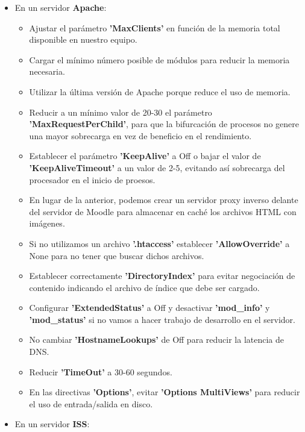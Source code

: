 \documentclass[a4paper, 10pt]{article} %
\begin{document}
\begin{itemize}

    \item En un servidor \textbf{Apache}:
    
    \begin{itemize}
        \item Ajustar el parámetro \textbf{'MaxClients'} en función de la memoria total disponible en nuestro equipo.
        \item Cargar el mínimo número posible de módulos para reducir la memoria necesaria.
        \item Utilizar la última versión de Apache porque reduce el uso de memoria.
        \item Reducir a un mínimo valor de 20-30 el parámetro \textbf{'MaxRequestPerChild'}, para que la bifurcación de procesos no genere una mayor sobrecarga en vez de beneficio en el rendimiento.
        \item Establecer el parámetro \textbf{'KeepAlive'} a Off o bajar el valor de \textbf{'KeepAliveTimeout'} a un valor de 2-5, evitando así sobrecarga del procesador en el inicio de proesos.
        \item En lugar de la anterior, podemos crear un servidor proxy inverso delante del servidor de Moodle para almacenar en caché los archivos HTML con imágenes.
        \item Si no utilizamos un archivo \textbf{'.htaccess'} establecer \textbf{'AllowOverride'} a None para no tener que buscar dichos archivos.
        \item Establecer correctamente \textbf{'DirectoryIndex'} para evitar negociación de contenido indicando el archivo de índice que debe ser cargado.
        \item Configurar \textbf{'ExtendedStatus'} a Off y desactivar \textbf{'mod\_info'} y \textbf{'mod\_status'} si no vamos a hacer trabajo de desarrollo en el servidor.
        \item No cambiar \textbf{'HostnameLookups'} de Off para reducir la latencia de DNS.
        \item Reducir \textbf{'TimeOut'} a 30-60 segundos.
        \item En las directivas \textbf{'Options'}, evitar \textbf{'Options MultiViews'} para reducir el uso de entrada/salida en disco.
    \end{itemize}
    
    \item En un servidor \textbf{ISS}:
    

\end{itemize}
\end{document}

